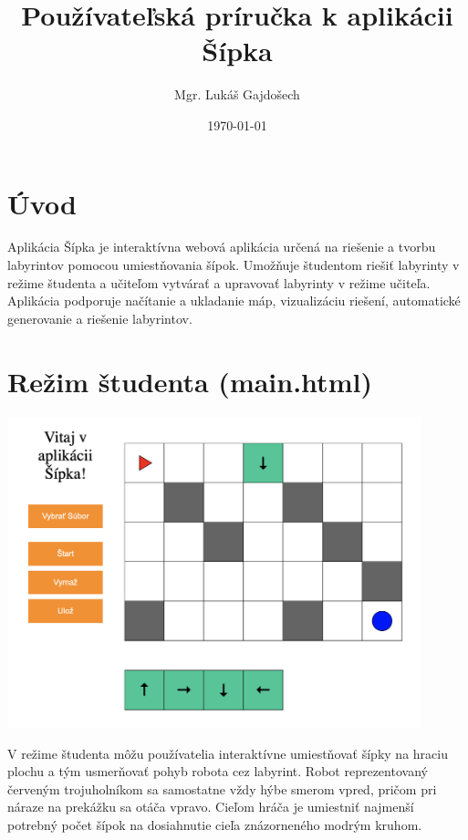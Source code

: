 \documentclass{article}
\title{\Huge Používateľská príručka k aplikácii Šípka}
\author{Mgr. Lukáš Gajdošech}
\date{\today}
\begin{document}
\maketitle

\section*{Úvod}
Aplikácia Šípka je interaktívna webová aplikácia určená na riešenie a tvorbu labyrintov pomocou umiestňovania šípok. 
Umožňuje študentom riešiť labyrinty v režime študenta a učiteľom vytvárať a upravovať labyrinty v režime učiteľa. 
Aplikácia podporuje načítanie a ukladanie máp, vizualizáciu riešení, automatické generovanie a riešenie labyrintov.

\section*{Režim študenta (main.html)}

\begin{center}
    \includegraphics[width=12cm]{student.png}
\end{center}

V režime študenta môžu používatelia interaktívne umiestňovať šípky na hraciu plochu a tým usmerňovať pohyb robota cez labyrint.
Robot reprezentovaný červeným trojuholníkom sa samostatne vždy hýbe smerom vpred, pričom pri náraze na prekážku sa otáča vpravo. 
Cieľom hráča je umiestniť najmenší potrebný počet šípok na dosiahnutie cieľa znázorneného modrým kruhom.

\newpage
\end{document}

